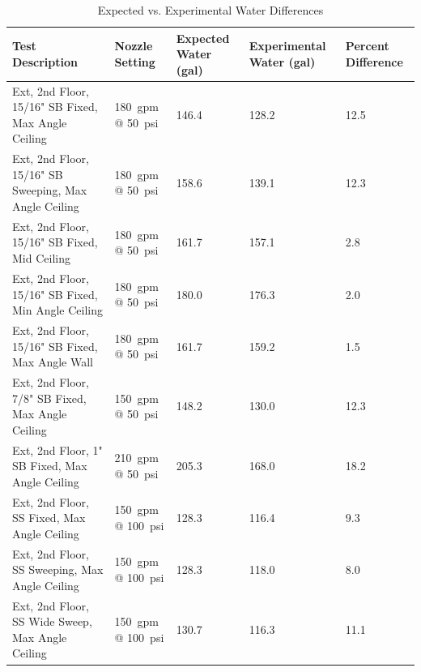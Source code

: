 \documentclass[12pt,oneside]{book}
\begin{document}
\begin{table}[!ht]
\tiny
\centering
\caption{Expected vs. Experimental Water Differences}
\label{Expected_vs._Experimental_Water_Differences}
\begin{tabular}{lllll}
\toprule[1.5pt]
Test Description                                      & Nozzle Setting                 & Expected Water (gal)              & Experimental Water (gal)           & Percent Difference     \\
\midrule
Ext, 2nd Floor, 15/16" SB Fixed, Max Angle Ceiling    & 180~gpm @ 50~psi               & 146.4                             & 128.2                              & 12.5                   \\
Ext, 2nd Floor, 15/16" SB Sweeping, Max Angle Ceiling & 180~gpm @ 50~psi               & 158.6                             & 139.1                              & 12.3                   \\
Ext, 2nd Floor, 15/16" SB Fixed, Mid Ceiling          & 180~gpm @ 50~psi               & 161.7                             & 157.1                              & 2.8                    \\
Ext, 2nd Floor, 15/16" SB Fixed, Min Angle Ceiling    & 180~gpm @ 50~psi               & 180.0                             & 176.3                              & 2.0                    \\
Ext, 2nd Floor, 15/16" SB Fixed, Max Angle Wall       & 180~gpm @ 50~psi               & 161.7                             & 159.2                              & 1.5                    \\
Ext, 2nd Floor, 7/8" SB Fixed, Max Angle Ceiling      & 150~gpm @ 50~psi               & 148.2                             & 130.0                              & 12.3                   \\
Ext, 2nd Floor, 1" SB Fixed, Max Angle Ceiling        & 210~gpm @ 50~psi               & 205.3                             & 168.0                              & 18.2                   \\
Ext, 2nd Floor, SS Fixed, Max Angle Ceiling           & 150~gpm @ 100~psi              & 128.3                             & 116.4                              & 9.3                    \\
Ext, 2nd Floor, SS Sweeping, Max Angle Ceiling        & 150~gpm @ 100~psi              & 128.3                             & 118.0                              & 8.0                    \\
Ext, 2nd Floor, SS Wide Sweep, Max Angle Ceiling      & 150~gpm @ 100~psi              & 130.7                             & 116.3                              & 11.1                   \\

\end{tabular}
\end{table}
\end{document}

